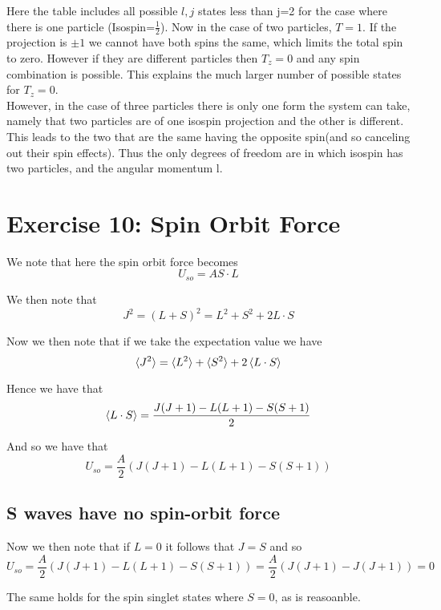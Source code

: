 \documentclass[11pt]{article} %
\begin{document}
\FloatBarrier
Here the table includes all possible $l,j$ states less than j=2 for the case where there is one particle (Isospin=$\frac{1}{2}$). Now in the case of two particles, $T=1$. If the projection is $\pm 1$ we cannot have both spins the same, which limits the total spin to zero. However if they are different particles then $T_z=0$ and any spin combination is possible. This explains the much larger number of possible states for $T_z=0$.\\

However, in the case of three particles there is only one form the system can take, namely that two particles are of one isospin projection and the other is different. This leads to the two that are the same having the opposite spin(and so canceling out their spin effects). Thus the only degrees of freedom are in which isospin has two particles, and the angular momentum l.

\section{Exercise 10: Spin Orbit Force}

We note that here the spin orbit force becomes \\

\begin{equation} U_{so}=A S \cdot L \end{equation}

We then note that\\

\begin{equation}
J^2=(L+S)^2=L^2+S^2+2L\cdot S
\end{equation}

Now we then note that if we take the expectation value we have\\

\begin{equation}
\braket{J^2}=\braket{L^2}+\braket{S^2}+2\braket{L\cdot S}
\end{equation}

Hence we have that\\

\begin{equation}
\braket{L \cdot S}=\frac{J(J+1)-L(L+1)-S(S+1)}{2}\end{equation}

And so we have that\\
\begin{equation}
U_{so}=\frac{A}{2}\left(J(J+1)-L(L+1)-S(S+1)\right)\end{equation}
\subsection{S waves have no spin-orbit force}

Now we then note that if $L=0$ it follows that $J=S$ and so
\begin{equation}
U_{so}=\frac{A}{2}\left(J(J+1)-L(L+1)-S(S+1)\right)=\frac{A}{2}\left(J(J+1)-J(J+1)\right)=0\end{equation}

The same holds for the spin singlet states where $S=0$, as is reasoanble.\\
\end{document}
